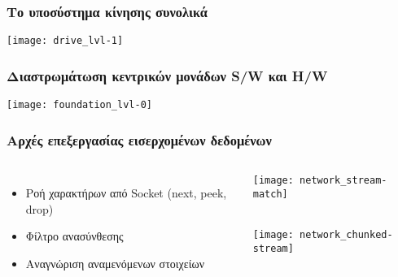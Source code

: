 \documentclass[xetex,mathserif,serif]{beamer}
\begin{document}
\begin{frame}\frametitle
    {Το υποσύστημα κίνησης συνολικά}

    \begin{center}
    \texttt{[image: drive\_lvl-1]}
    \end{center}
\end{frame}


\begin{frame}\frametitle
    {Διαστρωμάτωση κεντρικών μονάδων S\slash{}W και H\slash{}W}

    \begin{center}
    \texttt{[image: foundation\_lvl-0]}
    \end{center}
\end{frame}


\begin{frame}\frametitle
    {Αρχές επεξεργασίας εισερχομένων δεδομένων}

    \begin{columns}[t]
    \column{5cm}
    \begin{itemize}
    \item Ροή χαρακτήρων από Socket {\tiny (next, peek, drop)}
    \item Φίλτρο ανασύνθεσης
    \item Αναγνώριση αναμενόμενων στοιχείων
    \end{itemize}

    \column{6cm}
    \begin{center}
    \texttt{[image: network\_stream-match]}\\
    \rule{0pt}{0.5cm}\\
    \texttt{[image: network\_chunked-stream]}
    \end{center}

    \end{columns}
\end{frame}
\end{document}
